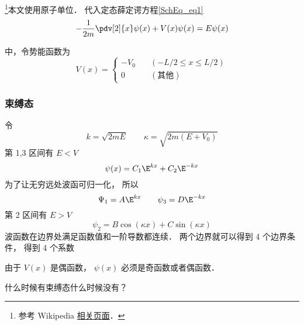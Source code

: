 




\footnote{参考 Wikipedia \href{https://en.wikipedia.org/wiki/Finite_potential_well}{相关页面}．}本文使用原子单位． 代入定态薛定谔方程\autoref{SchEq_eq1}~
\begin{equation}
-\frac{1}{2m}\pdv[2]{x}\psi(x) + V(x) \psi(x) = E \psi(x)
\end{equation}

中，令势能函数为
\begin{equation}
V(x) = \begin{cases}
-V_0 \quad &(-L/2 \leqslant x \leqslant L/2)\\
0 \quad &(\text{其他})
\end{cases}
\end{equation}



\subsubsection{束缚态}
令
\begin{equation}
k = \sqrt{2mE} \qquad \kappa = \sqrt{2m(E + V_0)}
\end{equation}
第 1,3 区间有 $E < V$
\begin{equation}
\psi(x) = C_1 \E^{kx} + C_2 \E^{-kx}
\end{equation}
为了让无穷远处波函可归一化， 所以
\begin{equation}
\Psi_1 = A \E^{kx} \qquad \psi_3 = D\E^{-kx}
\end{equation}
第 2 区间有 $E > V$
\begin{equation}
\psi_2 = B \cos(\kappa x) + C\sin(\kappa x)
\end{equation}
波函数在边界处满足函数值和一阶导数都连续． 两个边界就可以得到 4 个边界条件， 得到 4 个系数


由于 $V(x)$ 是偶函数， $\psi(x)$ 必须是奇函数或者偶函数．




什么时候有束缚态什么时候没有？
